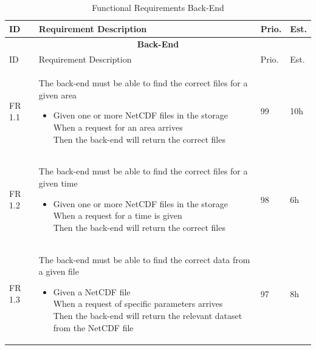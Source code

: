 \documentclass[11pt,a4paper,titlepage,oneside]{report}
\begin{document}
  \begin{longtable}{p{1.4cm} p{7.8cm} p{1cm} p{1cm} }
  \caption[]{Functional Requirements Back-End}\\
  \multicolumn{1}{p{1.4cm}}{ID} &
  \multicolumn{1}{p{7.8cm}}{Requirement Description} &
  \multicolumn{1}{p{1cm}}{Prio.} &
  \multicolumn{1}{p{1cm}}{Est.}
  \endhead

  \caption[Functional Requirements Back-End]{} \label{funcReqsBack} \\
  \hline \multicolumn{4}{c}{\textbf{Back-End}} \\
  \hline
  \multicolumn{1}{p{1.4cm}}{ID} &
  \multicolumn{1}{p{7.8cm}}{Requirement Description} &
  \multicolumn{1}{p{1cm}}{Prio.} &
  \multicolumn{1}{p{1cm}}{Est.}
  \endfirsthead
  
  \hline
  \multicolumn{4}{r}{{Continued on next page}} \\
  \endfoot

  \hline \hline
  \endlastfoot

  \hline  
  FR 1.1 & The back-end must be able to find the correct files for a given area
  
  \begin{itemize}
  \item \parbox[t]{6.8cm}{
        Given one or more NetCDF files in the storage \\ 
        When a request for an area arrives \\ 
        Then the back-end will return the correct files}
  \end{itemize}
   & 99 & 10h \\ \hline
  
  FR 1.2 & The back-end must be able to find the correct files for a given time 
  \begin{itemize}
  \item \parbox[t]{6.8cm}{
        Given one or more NetCDF files in the storage \\ 
        When a request for a time is given \\ 
        Then the back-end will return the correct files}
  \end{itemize}
  & 98 & 6h \\ \hline

  FR 1.3 & The back-end must be able to find the correct data from a given file 
  \begin{itemize}
  \item \parbox[t]{6.8cm}{
        Given a NetCDF file \\ 
        When a request of specific parameters arrives \\ 
        Then the back-end will return the relevant dataset from the NetCDF file}
  \end{itemize}
  & 97 & 8h \\ \hline


\end{longtable}
\end{document}
